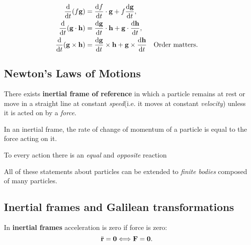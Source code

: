 \begin{proposition}\label{prop:product rules}
\begin{align*}
    \frac{\mathrm{d}}{\mathrm{d}t}(f{\bf g}) &= \frac{\mathrm{d}f}{\mathrm{d}t} \cdot {\bf g} + f \frac{\mathrm{d}{\bf g}}{\mathrm{d}t},\\
    \frac{\mathrm{d}}{\mathrm{d}t}({\bf g} \cdot {\bf h}) &= \frac{\mathrm{d}{\bf g}}{\mathrm{d}t} \cdot {\bf h} + {\bf g} \cdot \frac{\mathrm{d}{\bf h}}{\mathrm{d}t},\\ 
    \frac{\mathrm{d}}{\mathrm{d}t}({\bf g} \times {\bf h}) &= \frac{\mathrm{d}{\bf g}}{\mathrm{d}t} \times {\bf h} + {\bf g} \times \frac{\mathrm{d}{\bf h}}{\mathrm{d}t}\quad\text{Order matters}.\\
\end{align*}
\end{proposition}
\subsection{Newton's Laws of Motions}
\begin{law}
    There exists \textbf{inertial frame of reference} in which a particle remains at rest or move in a straight line at constant \textit{speed}(i.e. it moves at constant \textit{velocity}) unless it is acted on by a \textit{force}.
\end{law}
\begin{law}
    In an inertial frame, the rate of change of momentum of a particle is equal to the force acting on it.
\end{law}
\begin{law}
    To every action there is an \textit{equal} and \textit{opposite} reaction
\end{law}
\begin{note}
    All of these statements about particles can be extended to \textit{finite bodies} composed of many particles.
\end{note}

\subsection{Inertial frames and Galilean transformations}
\begin{definition}
    In \textbf{inertial frames} acceleration is zero if force is zero:
    \[
        \ddot{{\bf r}}=\mathbf{0} \Longleftrightarrow {\bf F} = \mathbf{0}.
    \]
\end{definition}

